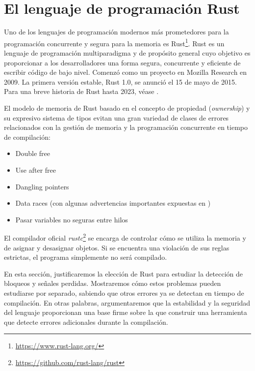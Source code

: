 \section{El lenguaje de programación Rust}

Uno de los lenguajes de programación modernos más prometedores para la programación
concurrente y segura para la memoria es Rust\footnote{\url{https://www.rust-lang.org/}}.
Rust es un lenguaje de programación multiparadigma y de propósito general
cuyo objetivo es proporcionar a los desarrolladores una
forma segura, concurrente y eficiente de escribir código de bajo nivel. Comenzó como un
proyecto en Mozilla Research en 2009. La primera versión estable, Rust 1.0, se anunció el 15
de mayo de 2015. Para una breve historia de Rust hasta 2023, véase \cite{thompson2023mit}.

El modelo de memoria de Rust basado en el concepto de propiedad (\textit{ownership}) y su expresivo sistema de
tipos evitan una gran variedad de clases de errores relacionados con la gestión de memoria y la
programación concurrente en tiempo de compilación:

\begin{itemize}
      \item Double free \cite[Chap. 4.1]{rust-book}
      \item Use after free \cite[Chap. 4.1]{rust-book}
      \item Dangling pointers \cite[Chap. 4.2]{rust-book}
      \item Data races \cite[Chap. 4.2]{rust-book}
            (con algunas advertencias importantes expuestas en \cite[Chap. 8.1]{rustonomicon})
      \item Pasar variables no seguras entre hilos \cite[Chap. 16.4]{rust-book}
\end{itemize}

El compilador oficial \emph{rustc}\footnote{\url{https://github.com/rust-lang/rust}}
se encarga de controlar cómo se utiliza la memoria y de asignar y
desasignar objetos.
Si se encuentra una violación de sus reglas estrictas, el programa
simplemente no será compilado.

En esta sección, justificaremos la elección de Rust para estudiar la detección de bloqueos y
señales perdidas. Mostraremos cómo estos problemas pueden estudiarse por separado, sabiendo
que otros errores ya se detectan en tiempo de compilación. En otras palabras, argumentaremos
que la estabilidad y la seguridad del lenguaje proporcionan una base firme sobre la que
construir una herramienta que detecte errores adicionales durante la compilación.

